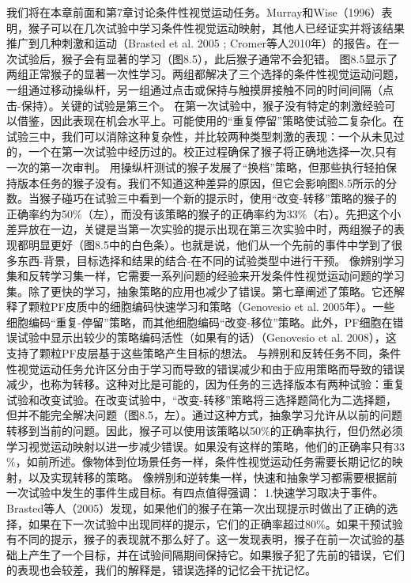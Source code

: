 我们将在本章前面和第7章讨论条件性视觉运动任务。Murray和Wise（1996）表明，猴子可以在几次试验中学习条件性视觉运动映射，其他人已经证实并将该结果推广到几种刺激和运动（Brasted et al. 2005 ; Cromer等人2010年）的报告。在一次试验后，猴子会有显著的学习（图8.5），此后猴子通常不会犯错。
图8.5显示了两组正常猴子的显著一次性学习。两组都解决了三个选择的条件性视觉运动问题，一组通过移动操纵杆，另一组通过点击或保持与触摸屏接触不同的时间间隔（点击-保持）。关键的试验是第三个。
在第一次试验中，猴子没有特定的刺激经验可以借鉴，因此表现在机会水平上。可能使用的“重复停留”策略使试验二复杂化。在试验三中，我们可以消除这种复杂性，并比较两种类型刺激的表现：一个从未见过的，一个在第一次试验中经历过的。校正过程确保了猴子将正确地选择一次,只有一次的第一次审判。
用操纵杆测试的猴子发展了“换档”策略，但那些执行轻拍保持版本任务的猴子没有。我们不知道这种差异的原因，但它会影响图8.5所示的分数。当猴子碰巧在试验三中看到一个新的提示时，使用“改变-转移”策略的猴子的正确率约为50$\%$（左），而没有该策略的猴子的正确率约为33$\%$（右）。先把这个小差异放在一边，关键是当第一次实验的提示出现在第三次实验中时，两组猴子的表现都明显更好（图8.5中的白色条）。也就是说，他们从一个先前的事件中学到了很多东西-背景，目标选择和结果的结合-在不同的试验类型中进行干预。
像辨别学习集和反转学习集一样，它需要一系列问题的经验来开发条件性视觉运动问题的学习集。除了更快的学习，抽象策略的应用也减少了错误。第七章阐述了策略。它还解释了颗粒PF皮质中的细胞编码快速学习和策略（Genovesio et al. 2005年）。一些细胞编码“重复-停留”策略，而其他细胞编码“改变-移位”策略。此外，PF细胞在错误试验中显示出较少的策略编码活性（如果有的话）（Genovesio et al. 2008），这支持了颗粒PF皮层基于这些策略产生目标的想法。
与辨别和反转任务不同，条件性视觉运动任务允许区分由于学习而导致的错误减少和由于应用策略而导致的错误减少，也称为转移。这种对比是可能的，因为任务的三选择版本有两种试验：重复试验和改变试验。在改变试验中，“改变-转移”策略将三选择题简化为二选择题，但并不能完全解决问题（图8.5，左）。通过这种方式，抽象学习允许从以前的问题转移到当前的问题。因此，猴子可以使用该策略以50$\%$的正确率执行，但仍然必须学习视觉运动映射以进一步减少错误。如果没有这样的策略，他们的正确率只有33$\%$，如前所述。像物体到位场景任务一样，条件性视觉运动任务需要长期记忆的映射，以及实现转移的策略。
像辨别和逆转集一样，快速和抽象学习都需要根据前一次试验中发生的事件生成目标。有四点值得强调：
1.快速学习取决于事件。Brasted等人（2005）发现，如果他们的猴子在第一次出现提示时做出了正确的选择，如果在下一次试验中出现同样的提示，它们的正确率超过80$\%$。如果干预试验有不同的提示，猴子的表现就不那么好了。这一发现表明，猴子在前一次试验的基础上产生了一个目标，并在试验间隔期间保持它。如果猴子犯了先前的错误，它们的表现也会较差，我们的解释是，错误选择的记忆会干扰记忆。
